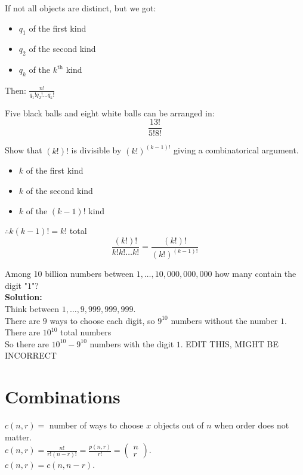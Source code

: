 \begin{theorem}
    []
    If not all objects are distinct, but we got:
    \begin{itemize}
        \item $q_1$ of the first kind
        \item $q_2$ of the second kind
        \item $q_k$ of the $k^{\text{th}}$ kind
    \end{itemize}
    Then: $\frac{n!}{q_1!q_2!\ldots q_k!}$
\end{theorem}

\begin{example}
    Five black balls and eight white balls can be arranged in:
    \[
        \frac{13!}{5!8!}
    \]
\end{example}

\begin{example}
    Show that $(k!)!$ is divisible by $(k!)^{(k-1)!}$ giving a combinatorical argument.
    \begin{itemize}
        \item $k$ of the first kind
        \item $k$ of the second kind
        \item $k$ of the $(k-1)!$ kind
    \end{itemize}
    $\therefore k(k-1)! = k!$ total
    \[
        \frac{(k!)!}{k!k!\ldots k!} = \frac{(k!)!}{(k!)^{(k-1)!}}
    \]
\end{example}

\begin{example}
    Among 10 billion numbers between $1, \ldots, 10,000,000,000$ how many contain the digit "$1$"? \\
    \textbf{Solution:} \\
    Think between $1, \ldots, 9,999,999,999$.\\
    There are $9$ ways to choose each digit, so $9^{10}$ numbers without the number $1$. There are $10^{10}$ total numbers \\
    So there are $10^{10} - 9^{10}$ numbers with the digit $1$.
    EDIT THIS, MIGHT BE INCORRECT
\end{example}

\section{Combinations}
\begin{definition}
    [Combinations]
    $c(n,r) = $ number of ways to choose $x$ objects out of $n$ when order does not matter. \\
    $c(n,r) = \frac{n!}{r!(n-r)!} = \frac{p(n,r)}{r!} = \left( \begin{matrix}
                n \\
                r
            \end{matrix} \right). $ \\
    $c(n,r) = c(n,n-r)$.
\end{definition}

